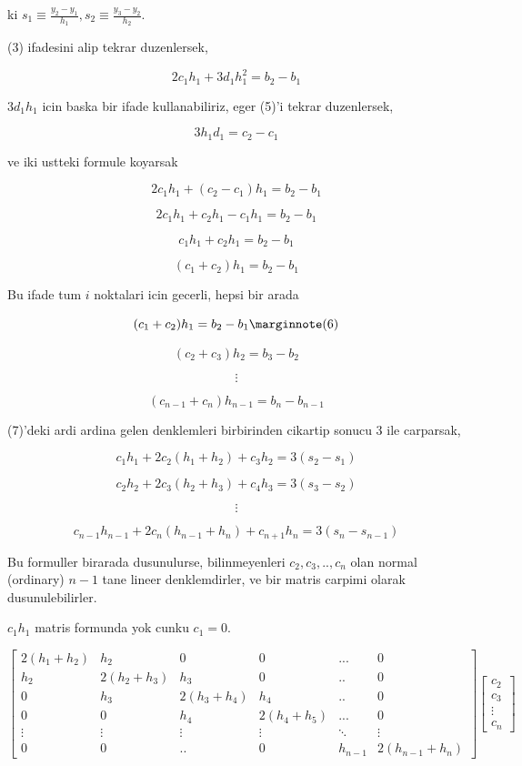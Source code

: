\documentclass[12pt,fleqn]{article}\usepackage{../common}
\begin{document}
ki $s_1 \equiv \frac{y_2 - y_1}{h_1}, s_2 \equiv \frac{y_3 - y_2}{h_2}$. 

(3) ifadesini alip tekrar duzenlersek, 

$$  2c_1h_1 + 3d_1h_1^2  = b_2 - b_1$$

$3d_1h_1$ icin baska bir ifade kullanabiliriz, eger (5)'i tekrar
duzenlersek,

$$ 3h_1d_1 = c_2 - c_1$$

ve iki ustteki formule koyarsak

$$  2c_1h_1 + (c_2 - c_1)h_1  = b_2 - b_1$$

$$  2c_1h_1 + c_2h_1 - c_1h_1  = b_2 - b_1$$

$$  c_1h_1 + c_2h_1  = b_2 - b_1$$

$$  (c_1 + c_2) h_1  = b_2 - b_1$$

Bu ifade tum $i$ noktalari icin gecerli, hepsi bir arada

$$  (c_1 + c_2) h_1  = b_2 - b_1 
\mlabel{6}$$

$$  (c_2 + c_3) h_2  = b_3 - b_2$$

$$ \vdots $$

$$  (c_{n-1} + c_n) h_{n-1}  = b_n - b_{n-1}$$

(7)'deki ardi ardina gelen denklemleri birbirinden cikartip sonucu 3 ile
carparsak, 

$$ c_1h_1 + 2c_2(h_1 + h_2) + c_3h_2 = 3(s_2 - s_1) $$

$$ c_2h_2 + 2c_3(h_2 + h_3) + c_4h_3 = 3(s_3 - s_2) $$

$$ \vdots $$

$$ c_{n-1}h_{n-1} + 2c_n(h_{n-1} + h_{n}) + c_{n+1}h_n = 3(s_n - s_{n-1}) $$

Bu formuller birarada dusunulurse, bilinmeyenleri $c_2,c_3,..,c_n$ olan
normal (ordinary) $n-1$ tane lineer denklemdirler, ve bir matris carpimi
olarak dusunulebilirler. 

$c_1h_1$ matris formunda yok cunku $c_1=0$. 

$$ 
\left[\begin{array}{cccccc}
2(h_1+h_2) & h_2 & 0 & 0 & ... & 0 \\
h_2 & 2(h_2+h_3) & h_3 & 0 & .. & 0  \\
0 & h_3 & 2(h_3+h_4) & h_4 & .. & 0 \\
0 & 0 & h_4 & 2(h_4+h_5) & ... & 0 \\
\vdots & \vdots & \vdots & \vdots & \ddots & \vdots  \\
0 & 0 & .. & 0 & h_{n-1} & 2(h_{n-1}+h_n) 
\end{array}\right]
\left[\begin{array}{r}
c_2 \\ c_3 \\ \vdots \\ c_n
\end{array}\right]
 $$
\end{document}
